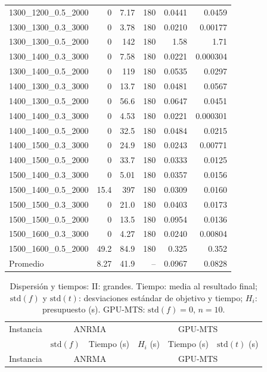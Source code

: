 \begin{landscape}
\begin{longtable}{lrrrrr}
1300\_1200\_0.5\_2000 & 0 & 7.17 & 180 & 0.0441 & 0.0459\\
1300\_1300\_0.3\_3000 & 0 & 3.78 & 180 & 0.0210 & 0.00177\\
1300\_1300\_0.5\_2000 & 0 & 142 & 180 & 1.58 & 1.71\\
1300\_1400\_0.3\_3000 & 0 & 7.58 & 180 & 0.0221 & 0.000304\\
1300\_1400\_0.5\_2000 & 0 & 119 & 180 & 0.0535 & 0.0297\\
1400\_1300\_0.3\_3000 & 0 & 13.7 & 180 & 0.0481 & 0.0567\\
1400\_1300\_0.5\_2000 & 0 & 56.6 & 180 & 0.0647 & 0.0451\\
1400\_1400\_0.3\_3000 & 0 & 4.53 & 180 & 0.0221 & 0.000301\\
1400\_1400\_0.5\_2000 & 0 & 32.5 & 180 & 0.0484 & 0.0215\\
1400\_1500\_0.3\_3000 & 0 & 24.9 & 180 & 0.0243 & 0.00771\\
1400\_1500\_0.5\_2000 & 0 & 33.7 & 180 & 0.0333 & 0.0125\\
1500\_1400\_0.3\_3000 & 0 & 5.01 & 180 & 0.0357 & 0.0156\\
1500\_1400\_0.5\_2000 & 15.4 & 397 & 180 & 0.0309 & 0.0160\\
1500\_1500\_0.3\_3000 & 0 & 21.0 & 180 & 0.0403 & 0.0173\\
1500\_1500\_0.5\_2000 & 0 & 13.5 & 180 & 0.0954 & 0.0136\\
1500\_1600\_0.3\_3000 & 0 & 4.27 & 180 & 0.0240 & 0.00804\\
1500\_1600\_0.5\_2000 & 49.2 & 84.9 & 180 & 0.325 & 0.352\\
\midrule
Promedio & 8.27 & 41.9 & -- & 0.0967 & 0.0828\\
\end{longtable}\clearpage
\footnotesize\setlength{\tabcolsep}{4pt}\renewcommand{\arraystretch}{.88}
\begin{longtable}{lrrrrr}
\caption{Dispersión y tiempos: II: grandes. Tiempo: media al resultado final; $\mathrm{std}(f)$ y $\mathrm{std}(t)$: desviaciones estándar de objetivo y tiempo; $H_i$: presupuesto (s). GPU-MTS: $\mathrm{std}(f)=0$, $n=10$.}\\
\toprule
Instancia & \multicolumn{2}{c}{ANRMA} & \multicolumn{3}{c}{GPU-MTS}\\
 & $\mathrm{std}(f)$ & Tiempo (s) & $H_i$ (s) & Tiempo (s) & $\mathrm{std}(t)$ (s)\\
\midrule\endfirsthead
Instancia & \multicolumn{2}{c}{ANRMA} & \multicolumn{3}{c}{GPU-MTS}\\

\end{longtable}
\end{landscape}
